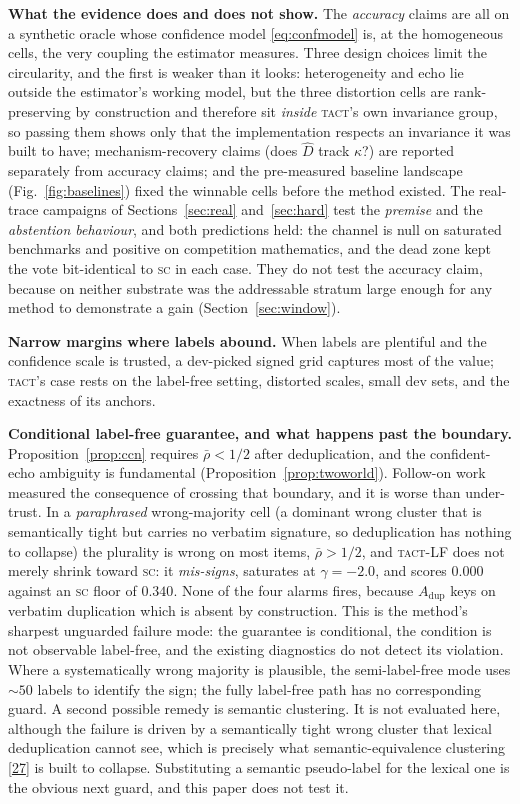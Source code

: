 \documentclass[conference]{IEEEtran}
\newcommand{\Dhat}{\widehat{D}}
\newcommand{\SC}{\textsc{sc}}
\newcommand{\TACT}{\textsc{tact}}
\begin{document}
\textbf{What the evidence does and does not show.} The \emph{accuracy} claims are all on a synthetic oracle whose confidence model \eqref{eq:confmodel} is, at the homogeneous cells, the very coupling the estimator measures. Three design choices limit the circularity, and the first is weaker than it
looks: heterogeneity and echo lie outside the estimator's working model, but
the three distortion cells are rank-preserving by construction and therefore
sit \emph{inside} \TACT's own invariance group, so passing them shows only that the
implementation respects an invariance it was built to have; mechanism-recovery claims (does $\Dhat$ track $\kappa$?) are reported separately from accuracy claims; and the pre-measured baseline landscape (Fig.~\ref{fig:baselines}) fixed the winnable cells before the method existed. The real-trace campaigns of Sections~\ref{sec:real} and~\ref{sec:hard} test the \emph{premise} and the \emph{abstention behaviour}, and both predictions held: the channel is null on saturated benchmarks and positive on competition mathematics, and the dead zone kept the vote bit-identical to \SC{} in each case. They do not test the accuracy claim, because on neither substrate was the addressable stratum large enough for any method to demonstrate a gain (Section~\ref{sec:window}).

\textbf{Narrow margins where labels abound.} When labels are plentiful and the confidence scale is trusted, a dev-picked signed grid captures most of the value; \TACT's case rests on the label-free setting, distorted scales, small dev sets, and the exactness of its anchors.

\textbf{Conditional label-free guarantee, and what happens past the boundary.}
Proposition~\ref{prop:ccn} requires $\bar\rho<1/2$ after deduplication, and the
confident-echo ambiguity is fundamental (Proposition~\ref{prop:twoworld}).
Follow-on work measured the consequence of crossing that boundary, and it is
worse than under-trust. In a \emph{paraphrased} wrong-majority cell (a dominant
wrong cluster that is semantically tight but carries no verbatim signature, so
deduplication has nothing to collapse) the plurality is wrong on most items,
$\bar\rho>1/2$, and \TACT-LF does not merely shrink toward \SC: it
\emph{mis-signs}, saturates at $\gamma=-2.0$, and scores $0.000$ against an
\SC{} floor of $0.340$. None of the four alarms fires, because $A_{\mathrm{dup}}$ keys on
verbatim duplication which is absent by construction. This is the method's
sharpest unguarded failure mode: the guarantee is conditional, the condition is
not observable label-free, and the existing diagnostics do not detect its
violation. Where a systematically wrong majority is plausible, the
semi-label-free mode uses ${\sim}50$ labels to identify the sign; the fully
label-free path has no corresponding guard. A second possible remedy is semantic
clustering. It is not evaluated here, although the failure is driven by a semantically tight wrong cluster that
lexical deduplication cannot see, which is precisely what semantic-equivalence
clustering [\hyperlink{bib:kuhn2023semantic}{27}] is built to collapse. Substituting a
semantic pseudo-label for the lexical one is the obvious next guard, and this
paper does not test it.
\end{document}
